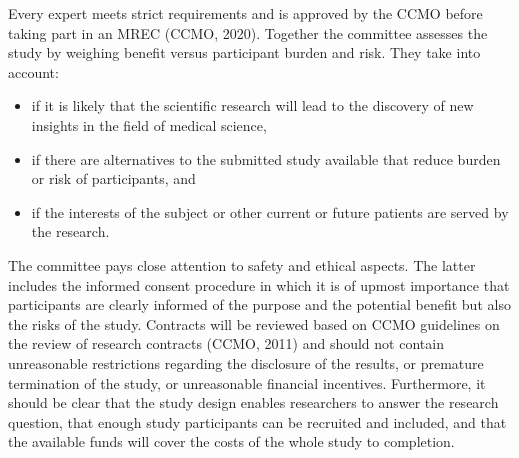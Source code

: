 \documentclass[authordate, meta]{jote-new-article}
\begin{document}
Every expert meets strict requirements and is approved by the CCMO before taking part in an MREC (CCMO, 2020). Together the committee assesses the study by weighing benefit versus participant burden and risk. They take into account:


\begin{itemize}


  \item if it is likely that the scientific research will lead to the discovery of new insights in the field of medical science,



  \item
        if there are alternatives to the submitted study available that reduce burden or risk of participants, and



  \item if the interests of the subject or other current or future patients are served by the research.


\end{itemize}

The committee pays close attention to safety and ethical aspects. The latter includes the informed consent procedure in which it is of upmost importance that participants are clearly informed of the purpose and the potential benefit but also the risks of the study. Contracts will be reviewed based on CCMO guidelines on the review of research contracts (CCMO, 2011)  and should not contain unreasonable restrictions regarding the disclosure of the results, or premature termination of the study, or unreasonable financial incentives. Furthermore, it should be clear that the study design enables researchers to answer the research question, that enough study participants can be recruited and included, and that the available funds will cover the costs of the whole study to completion.
\end{document}
